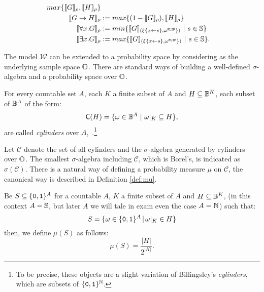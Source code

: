 \begin{defn}
\begin{minipage}{\linewidth}
\begin{minipage}[t]{0.5\linewidth}
\begin{align*}
max\{\llbracket G\rrbracket_\rho, \llbracket H\rrbracket_\rho\} \\
%
\llbracket G\rightarrow H\rrbracket_\rho
&:= max\{(1-\llbracket G\rrbracket_\rho), \llbracket H\rrbracket_\rho\} \\
%
\llbracket \forall x.G\rrbracket_\rho &:= min\{\llbracket G
\rrbracket_{(\xi\{x\leftarrow s\}, \omega^{\mathtt{FLIP}}\})} \ | \ s\in \Ss\} \\
%
\llbracket \exists x.G\rrbracket_\rho &:=
max\{\llbracket G\rrbracket_{(\xi\{x\leftarrow s\}, \omega^{\mathtt{FLIP}}\})} \ | \ s \in \Ss\}.
\end{align*}
\end{minipage}
\end{minipage}
\end{defn}


The model $\mathscr{W}$
can be extended to a probability space
by considering as the underlying
sample space $\mathbb{O}$.
There are standard ways of building
a well-defined $\sigma$-algebra and
a probability space over $\mathbb{O}$.

\begin{defn}
  \label{def:cylsigmaalgebra}
  For every countable set $A$, each $K$ a finite subset of $A$
  and $H\subseteq \mathbb{B}^K$, each subset of $\mathbb{B}^A$ of the form:
  $$
  \mathsf{C}(H) = \{\omega \in \mathbb{B}^A\ | \ \omega|_K \subseteq H\},
  $$
  are called \emph{cylinders} over $A$,~\cite{Billingsley}.\footnote{To be precise, these objects
  are a slight variation of {Billingsley}'s \emph{cylinders}, which
  are subsets of $\{\mathtt{0}, \mathtt{1}\}^{\mathbb{N}}$.}
\end{defn}

Let $\mathscr{C}$
denote the set of all
cylinders and the $\sigma$-algebra generated by cylinders over $\mathbb{O}$.
The smallest $\sigma$-algebra
including $\mathscr{C}$,
which is Borel's,
is indicated as $\sigma(\mathscr{C})$.
There is a natural way of defining a probability
measure $\mu$
on $\mathscr{C}$, the canonical way is described in Definition \ref{def:mu}.

\begin{defn}
  \label{def:mu}
  Be $S \subseteq \{\mathtt{0}, \mathtt{1}\}^A$ for a countable $A$,
  $K$ a finite subset of $A$
  and $H\subseteq \mathbb{B}^K$,
  (in this context $A=\mathbb{S}$, but later $A$ we will tale in exam even the case $A=\mathbb{N}$)
  such that:
  $$
    S=\{\omega \in \{\mathtt{0}, \mathtt{1}\}^A\, |\, \omega|_K \in H\}
  $$
  then, we define $\mu(S)$ as follows:
  $$
  \mu(S)= \frac {|H|}{2^{|K|}}.
  $$
\end{defn}

